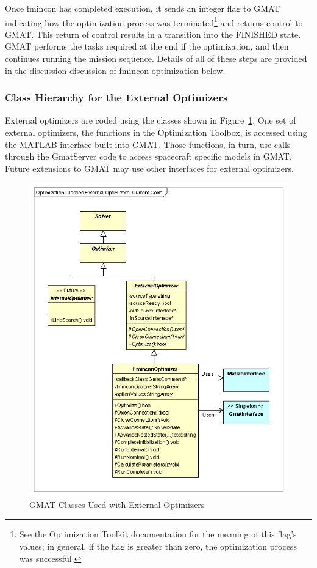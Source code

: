 Once fmincon has completed execution, it sends an integer flag to GMAT indicating how the
optimization process was terminated\footnote{See the Optimization Toolkit documentation for the
meaning of this flag's values; in general, if the flag is greater than zero, the optimization
process was successful.} and returns control to GMAT.  This return of control results in a
transition into the FINISHED state.  GMAT performs the tasks required at the end if the
optimization, and then continues running the mission sequence.  Details of all of these steps are
provided in the discussion discussion of fmincon optimization below.

\subsubsection{Class Hierarchy for the External Optimizers}

External optimizers are coded using the classes shown in
Figure~\ref{figure:OptimizationClassesExternalOptimizers}.  One set of external optimizers, the
functions in the Optimization Toolbox, is accessed using the MATLAB interface built into GMAT.
Those functions, in turn, use calls through the GmatServer code to access spacecraft specific models
in GMAT.  Future extensions to GMAT may use other interfaces for external optimizers.

\begin{figure}[htb]
\begin{center}
\includegraphics[280,330]{Images/OptimizationClassesExternalOptimizersCurrentCode.png}
\caption{\label{figure:OptimizationClassesExternalOptimizers}GMAT Classes Used with External
Optimizers}
\end{center}
\end{figure}


